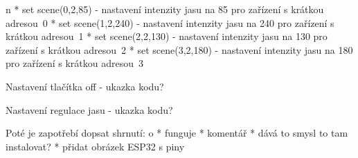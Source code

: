 \begitems \style n
* set scene(0,2,85) - nastavení intenzity jasu na 85 pro zařízení s krátkou adresou~0
* set scene(1,2,240) - nastavení intenzity jasu na 240 pro zařízení s krátkou adresou~1
* set scene(2,2,130) - nastavení intenzity jasu na 130 pro zařízení s krátkou adresou~2
* set scene(3,2,180) - nastavení intenzity jasu na 180 pro zařízení s krátkou adresou~3
\enditems

\noindent Nastavení tlačítka off - ukazka kodu?

\noindent Nastavení regulace jasu - ukazka kodu?


\noindent Poté je zapotřebí dopsat shrnutí:
\begitems \style o
* funguje
* komentář
* dává to smysl to tam instalovat?
* přidat obrázek ESP32 s piny

\enditems











